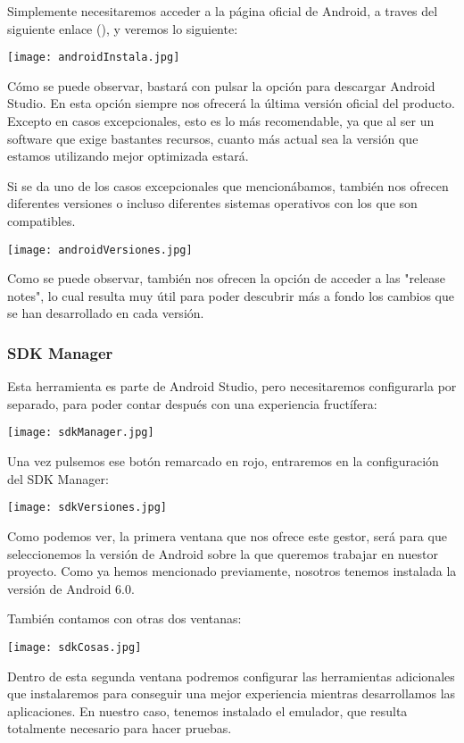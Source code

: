 Simplemente necesitaremos acceder a la página oficial de Android, a traves del siguiente enlace (), y veremos lo siguiente:

\texttt{[image: androidInstala.jpg]}

Cómo se puede observar, bastará con pulsar la opción para descargar Android Studio. En esta opción siempre nos ofrecerá la última versión oficial del producto. Excepto en casos excepcionales, esto es lo más recomendable, ya que al ser un software que exige bastantes recursos, cuanto más actual sea la versión que estamos utilizando mejor optimizada estará. 

Si se da uno de los casos excepcionales que mencionábamos, también nos ofrecen diferentes versiones o incluso diferentes sistemas operativos con los que son compatibles.

\texttt{[image: androidVersiones.jpg]}

Como se puede observar, también nos ofrecen la opción de acceder a las "release notes", lo cual resulta muy útil para poder descubrir más a fondo los cambios que se han desarrollado en cada versión.


\subsubsection{SDK Manager}

Esta herramienta es parte de Android Studio, pero necesitaremos configurarla por separado, para poder contar después con una experiencia fructífera:

\texttt{[image: sdkManager.jpg]}

Una vez pulsemos ese botón remarcado en rojo, entraremos en la configuración del SDK Manager:

\texttt{[image: sdkVersiones.jpg]}

Como podemos ver, la primera ventana que nos ofrece este gestor, será para que seleccionemos la versión de Android sobre la que queremos trabajar en nuestor proyecto. Como ya hemos mencionado previamente, nosotros tenemos instalada la versión de Android 6.0.

También contamos con otras dos ventanas:

\texttt{[image: sdkCosas.jpg]}

Dentro de esta segunda ventana podremos configurar las herramientas adicionales que instalaremos para conseguir una mejor experiencia mientras desarrollamos las aplicaciones. En nuestro caso, tenemos instalado el emulador, que resulta totalmente necesario para hacer pruebas.


